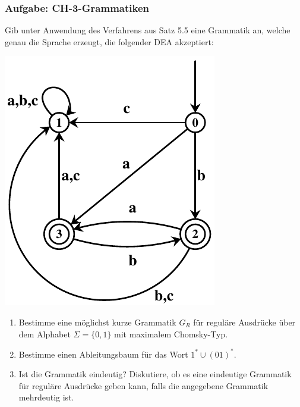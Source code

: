 \begin{frame}
\frametitle{Aufgabe: CH-3-Grammatiken}
Gib unter Anwendung des Verfahrens aus Satz 5.5 eine Grammatik an,
welche genau die Sprache erzeugt, die folgender DEA akzeptiert:

\begin{center}\includegraphics[scale=0.8]{./images/dea1.pdf}\end{center}
\end{frame}


\begin{frame}
\begin{enumerate}
\item Bestimme eine möglichst kurze Grammatik $G_R$ für reguläre Ausdrücke über dem Alphabet $\Sigma = \{0,1\}$ mit maximalem Chomsky-Typ.
\item Bestimme einen Ableitungsbaum für das Wort $1^* \cup (01)^*$. 
\item Ist die Grammatik eindeutig? Diskutiere, ob es eine eindeutige Grammatik für reguläre Ausdrücke geben kann, falls die angegebene Grammatik mehrdeutig ist.
\end{enumerate}
\end{frame}



